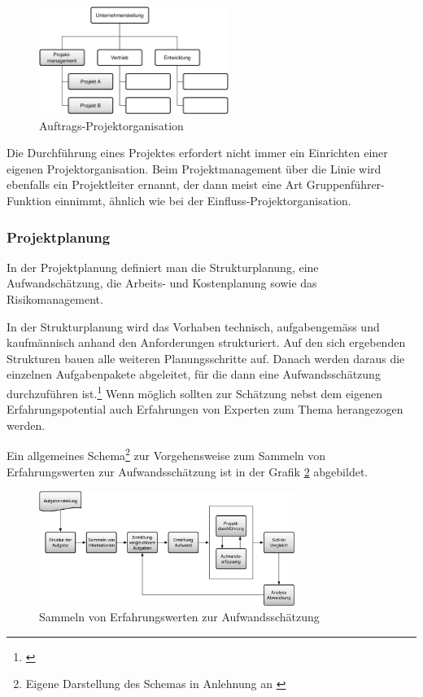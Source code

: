 \begin{figure}[htbp]
\begin{center}
\includegraphics[width=0.55\textwidth,angle=0]{./bilder/theorie/05_projektorganisationen_auftrags.pdf}
\caption{Auftrags-Projektorganisation}
\label{pic:05_projektorganisationen_auftrags}
\end{center}
\end{figure}

Die Durchführung eines Projektes erfordert nicht immer ein Einrichten einer eigenen
Projektorganisation. Beim Projektmanagement über die Linie wird ebenfalls ein
Projektleiter ernannt, der dann meist eine Art Gruppenführer-Funktion einnimmt,
ähnlich wie bei der Einfluss-Projektorganisation.

\subsubsection{Projektplanung}
In der Projektplanung definiert man die Strukturplanung, eine Aufwandschätzung,
die Arbeits- und Kostenplanung sowie das Risikomanagement.

In der Strukturplanung wird das Vorhaben technisch, aufgabengemäss und kaufmännisch
anhand den Anforderungen strukturiert. Auf den sich ergebenden Strukturen bauen
alle weiteren Planungsschritte auf. Danach werden daraus die einzelnen Aufgabenpakete
abgeleitet, für die dann eine Aufwandsschätzung durchzuführen ist.\footnote{\citealp*[Vgl.][S. 14]{burghardt2007einfuehrung}}
Wenn möglich sollten zur Schätzung nebst dem eigenen Erfahrungspotential auch
Erfahrungen von Experten zum Thema herangezogen werden.

Ein allgemeines Schema\footnote{Eigene Darstellung des Schemas in Anlehnung an \citealp*[S. 112]{litke2007projektmanagement}}
zur Vorgehensweise zum Sammeln von Erfahrungswerten zur Aufwandsschätzung ist in der Grafik \ref{pic:02_schema_aufwandsschaetzung}
abgebildet.

\begin{figure}[htbp]
\begin{center}
\includegraphics[width=0.74\textwidth,angle=0]{./bilder/theorie/02_schema_aufwandsschaetzung.pdf}
\caption{Sammeln von Erfahrungswerten zur Aufwandsschätzung}
\label{pic:02_schema_aufwandsschaetzung}
\end{center}
\end{figure}

